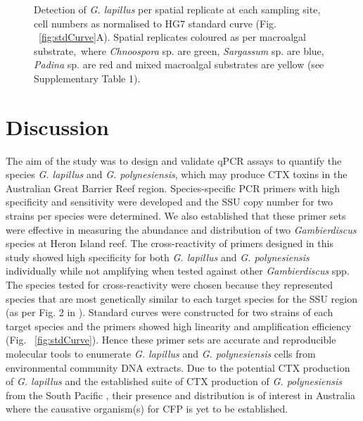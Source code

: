 \documentclass[12pt]{article}
\begin{document}
\FloatBarrier 
\begin{figure} 
\caption{Detection of \emph{G. lapillus} per spatial replicate at each sampling site, cell numbers as normalised to HG7 standard curve (Fig. ~\ref{fig:stdCurve}A). Spatial replicates coloured as per macroalgal substrate,\ where \emph{Chnoospora} sp. are green, \emph{Sargassum} sp. are blue, \emph{Padina} sp. are red and mixed macroalgal substrates are yellow (see Supplementary Table 1).} 
\label{fig:envHG7}
\end{figure} 
\FloatBarrier

\newpage
\section*{Discussion}
The aim of the study was to design and validate qPCR assays to quantify the species \emph{G. lapillus} and \emph{G. polynesiensis}, which may produce CTX toxins in the Australian Great Barrier Reef region. 
Species-specific PCR primers with high specificity and sensitivity were developed and the SSU copy number for two strains per species were determined. We also established that these primer sets were effective in measuring the abundance and distribution of two \emph{Gambierdiscus} species at Heron Island reef. The cross-reactivity of primers designed in this study showed high specificity for both \emph{G. lapillus} and \emph{G. polynesiensis} individually while not amplifying when tested against other \emph{Gambierdiscus} spp. The species tested for cross-reactivity were chosen because they represented species that are most genetically similar to each target species for the SSU region (as per Fig. 2 in \cite{kretzschmar2016characterization}).
Standard curves were constructed for two strains of each target species and the primers showed high linearity and amplification efficiency (Fig. ~\ref{fig:stdCurve}). Hence these primer sets are accurate and reproducible molecular tools to enumerate \emph{G. lapillus} and \emph{G. polynesiensis} cells from environmental community DNA extracts.
Due to the potential CTX production of \emph{G. lapillus} \cite{kretzschmar2016characterization} and the established suite of CTX production of \emph{G. polynesiensis} from the South Pacific \cite{chinain2010growth}, their presence and distribution is of interest in Australia where the causative organism(s) for CFP is yet to be established.\\
\end{document}
